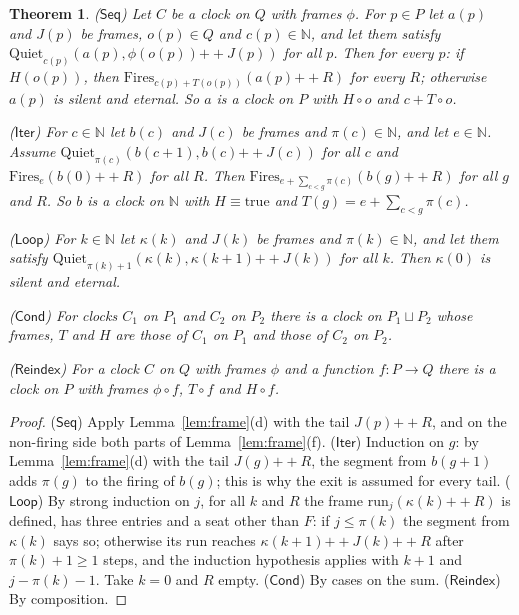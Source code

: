 \documentclass[11pt]{amsart}
\newtheorem{theorem}{Theorem}
\theoremstyle{definition}
\newcommand{\app}{\mathbin{+\!\!+}}
\newcommand{\run}{\mathrm{run}}
\newcommand{\Fires}{\mathrm{Fires}}
\newcommand{\Quiet}{\mathrm{Quiet}}
\newcommand{\Seq}{\mathsf{Seq}}
\newcommand{\Iter}{\mathsf{Iter}}
\newcommand{\Loop}{\mathsf{Loop}}
\newcommand{\Cond}{\mathsf{Cond}}
\newcommand{\Reindex}{\mathsf{Reindex}}
\begin{document}
\begin{theorem}\label{thm:closure}
\textup{($\Seq$)} Let $C$ be a clock on $Q$ with frames $\phi$. For $p\in P$ let $a(p)$ and
$J(p)$ be frames, $o(p)\in Q$ and $c(p)\in\mathbb N$, and let them satisfy $\Quiet_{c(p)}(a(p),\phi(o(p))\app J(p))$ for
all $p$. Then for every $p$: if $H(o(p))$, then $\Fires_{c(p)+T(o(p))}(a(p)\app R)$ for every $R$;
otherwise $a(p)$ is silent and eternal. So $a$ is a clock on $P$ with $H\circ o$ and
$c+T\circ o$.

\textup{($\Iter$)} For $c\in\mathbb N$ let $b(c)$ and $J(c)$ be frames and $\pi(c)\in\mathbb N$,
and let $e\in\mathbb N$. Assume $\Quiet_{\pi(c)}(b(c+1),b(c)\app J(c))$ for all $c$ and
$\Fires_e(b(0)\app R)$ for all $R$. Then $\Fires_{e+\sum_{c<g}\pi(c)}(b(g)\app R)$ for all $g$
and $R$. So $b$ is a clock on $\mathbb N$ with $H\equiv\mathrm{true}$ and
$T(g)=e+\sum_{c<g}\pi(c)$.

\textup{($\Loop$)} For $k\in\mathbb N$ let $\kappa(k)$ and $J(k)$ be frames and
$\pi(k)\in\mathbb N$, and let them satisfy $\Quiet_{\pi(k)+1}(\kappa(k),\kappa(k+1)\app J(k))$ for all $k$. Then $\kappa(0)$ is silent
and eternal.

\textup{($\Cond$)} For clocks $C_1$ on $P_1$ and $C_2$ on $P_2$ there is a clock on $P_1\sqcup P_2$
whose frames, $T$ and $H$ are those of $C_1$ on $P_1$ and those of $C_2$ on $P_2$.

\textup{($\Reindex$)} For a clock $C$ on $Q$ with frames $\phi$ and a function $f\colon P\to Q$
there is a clock on $P$ with frames $\phi\circ f$, $T\circ f$ and $H\circ f$.
\end{theorem}

\begin{proof}
($\Seq$) Apply Lemma~\ref{lem:frame}(d) with the tail $J(p)\app R$, and on the non-firing side
both parts of Lemma~\ref{lem:frame}(f). ($\Iter$) Induction on $g$: by Lemma~\ref{lem:frame}(d)
with the tail $J(g)\app R$, the segment from $b(g+1)$ adds $\pi(g)$ to the firing of $b(g)$; this
is why the exit is assumed for every tail. ($\Loop$) By strong induction on $j$, for all $k$ and
$R$ the frame $\run_j(\kappa(k)\app R)$ is defined, has three entries and a seat other than $F$:
if $j\le\pi(k)$ the segment from $\kappa(k)$ says so; otherwise its run reaches
$\kappa(k+1)\app J(k)\app R$ after $\pi(k)+1\ge1$ steps, and the induction hypothesis applies with
$k+1$ and $j-\pi(k)-1$. Take $k=0$ and $R$ empty. ($\Cond$) By cases on the sum. ($\Reindex$) By
composition.
\end{proof}
\end{document}
